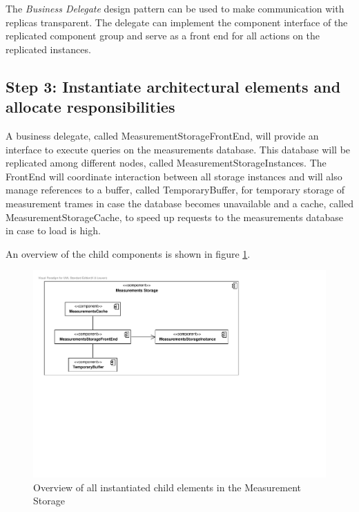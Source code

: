 \npar The \emph{Business Delegate} design pattern
\citep[see][p.~292]{Buschmann:07} can be used to make communication with
replicas transparent. The delegate can implement the component interface of the
replicated component group and serve as a front end for all actions on the
replicated instances.

\subsection{Step 3: Instantiate architectural elements and allocate responsibilities}
\label{add:it4/elements}

\npar A business delegate, called MeasurementStorageFrontEnd, will provide an
interface to execute queries on the measurements database. This database will be
replicated among different nodes, called MeasurementStorageInstances. The
FrontEnd will coordinate interaction between all storage instances and will also
manage references to a buffer, called TemporaryBuffer, for temporary storage of
measurement trames in case the database becomes unavailable and a cache, called
MeasurementStorageCache, to speed up requests to the measurements database in
case to load is high.

\npar An overview of the child components is shown in figure
\ref{fig:it4/elements}.

\begin{figure}[H]
	\begin{centering}
		\includegraphics[width=\textwidth]{figs/add-it4-elements.pdf}
		\caption{Overview of all instantiated child elements in the Measurement
		Storage}
		\label{fig:it4/elements}
	\end{centering}
\end{figure}

